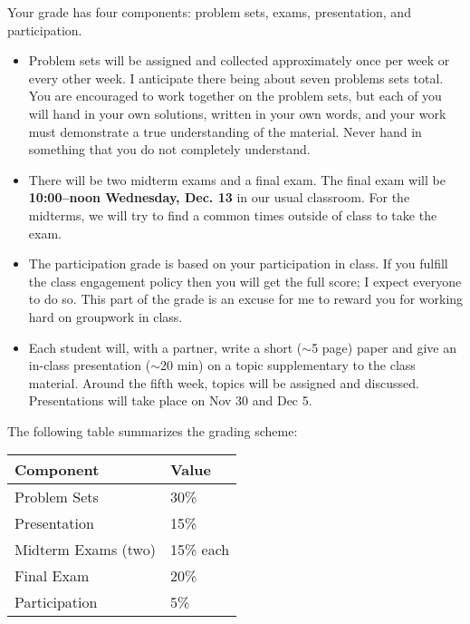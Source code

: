 \documentclass{amsart}
\begin{document}
\medskip

 Your grade has four components: problem sets, exams, presentation, and participation. 

\begin{itemize}
\item Problem sets will be assigned and collected approximately once per week or every other week. I anticipate there being about seven problems sets total.
You are encouraged to work together on the problem sets, but each of you will hand in your own solutions, written in your own words, and your work must demonstrate a true understanding of the material. Never hand in something that you do not completely understand.

\item There will be two midterm exams and a final exam. The final exam will be \textbf{10:00--noon
Wednesday, Dec. 13} in our usual classroom. For the midterms, we will try to find a common times outside of class to take the exam.

\item The participation grade is based on your participation in class. If you fulfill the class engagement policy then you will get the full score; I expect everyone to do so. This part of the grade is an excuse for me to reward you for working hard on groupwork in class.

\item Each student will, with a partner, write a short ($\sim$5 page) paper and give an in-class presentation ($\sim$20 min) on a topic supplementary to the class material. Around the fifth week, topics will be assigned and discussed. Presentations will take place on Nov 30 and Dec 5.
\end{itemize}
The following table summarizes the grading scheme:


\begin{center}

\begin{tabular}{|l|l|}
\hline
Component & Value \\
\hline \hline
Problem Sets & 30\% \\
\hline
Presentation & 15\% \\
\hline
Midterm Exams (two) &  15\% each \\
\hline
Final Exam & 20\% \\
\hline
Participation & 5\%\\
\hline
\end{tabular}

\end{center}
\
\end{document}
